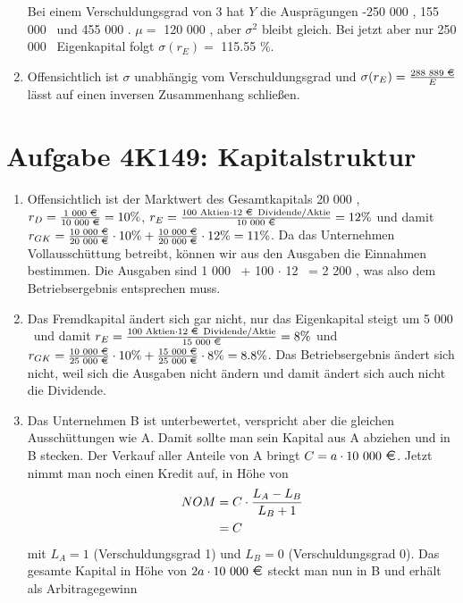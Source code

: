 \documentclass{article}
\begin{document}
\begin{enumerate}[label=(\alph*)]
		Bei einem Verschuldungsgrad von 3 hat $Y$ die Ausprägungen -250 000 \EUR, 155 000 \EUR\, und 455 000 \EUR. $\mu=$ 120 000 \EUR, aber $\sigma^2$ bleibt gleich. Bei jetzt aber nur 250 000 \EUR\, Eigenkapital folgt $\sigma(r_E)=$ 115.55 \%.
		\item Offensichtlich ist $\sigma$ unabhängig vom Verschuldungsgrad und $\sigma(r_E)=\frac{\text{288 889 \EUR}}{E}$ lässt auf einen inversen Zusammenhang schließen.
	\end{enumerate}
	
	\section*{Aufgabe 4K149: Kapitalstruktur}
	\begin{enumerate}[label=(\alph*)]
		\item Offensichtlich ist der Marktwert des Gesamtkapitals 20 000 \EUR, $r_D=\frac{\text{1 000 \EUR}}{\text{10 000 \EUR}}=10\%$, $r_E=\frac{100\text{ Aktien}\cdot \text{12 \EUR\, Dividende/Aktie}}{\text{10 000 \EUR}}=12\%$ und damit $r_{GK}=\frac{\text{10 000 \EUR}}{\text{20 000 \EUR}}\cdot 10\% + \frac{\text{10 000 \EUR}}{\text{20 000 \EUR}}\cdot 12\%=11\%$. Da das Unternehmen Vollausschüttung betreibt, können wir aus den Ausgaben die Einnahmen bestimmen. Die Ausgaben sind 1 000 \EUR\, + 100 $\cdot$ 12 \EUR\, = 2 200 \EUR, was also dem Betriebsergebnis entsprechen muss.
		\item Das Fremdkapital ändert sich gar nicht, nur das Eigenkapital steigt um 5 000 \EUR\, und damit $r_E=\frac{100\text{ Aktien}\cdot \text{12 \EUR\, Dividende/Aktie}}{\text{15 000 \EUR}}=8\%$ und $r_{GK}=\frac{\text{10 000 \EUR}}{\text{25 000 \EUR}}\cdot 10\% + \frac{\text{15 000 \EUR}}{\text{25 000 \EUR}}\cdot 8\%=8.8\%$. Das Betriebsergebnis ändert sich nicht, weil sich die Ausgaben nicht ändern und damit ändert sich auch nicht die Dividende.
		\item Das Unternehmen B ist unterbewertet, verspricht aber die gleichen Ausschüttungen wie A. Damit sollte man sein Kapital aus A abziehen und in B stecken. Der Verkauf aller Anteile von A bringt $C=a\cdot \text{10 000 \EUR}$. Jetzt nimmt man noch einen Kredit auf, in Höhe von
		\begin{align}
			NOM &= C\cdot\frac{L_A-L_B}{L_B+1} \notag \\
			&= C \notag
		\end{align}
		mit $L_A=1$ (Verschuldungsgrad 1) und $L_B=0$ (Verschuldungsgrad 0). Das gesamte Kapital in Höhe von $2a\cdot \text{10 000 \EUR}$ steckt man nun in B und erhält als Arbitragegewinn

\end{enumerate}
\end{document}

